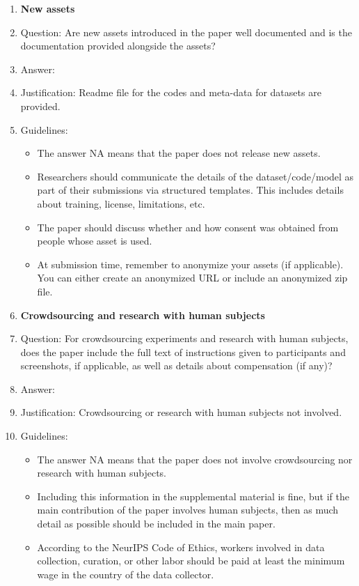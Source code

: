 \documentclass{article}
\begin{document}
\begin{enumerate}
\item {\bf New assets}
    \item[] Question: Are new assets introduced in the paper well documented and is the documentation provided alongside the assets?
    \item[] Answer: \answerYes{} %
    \item[] Justification: Readme file for the codes and meta-data for datasets are provided.
    \item[] Guidelines:
    \begin{itemize}
        \item The answer NA means that the paper does not release new assets.
        \item Researchers should communicate the details of the dataset/code/model as part of their submissions via structured templates. This includes details about training, license, limitations, etc. 
        \item The paper should discuss whether and how consent was obtained from people whose asset is used.
        \item At submission time, remember to anonymize your assets (if applicable). You can either create an anonymized URL or include an anonymized zip file.
    \end{itemize}

\item {\bf Crowdsourcing and research with human subjects}
    \item[] Question: For crowdsourcing experiments and research with human subjects, does the paper include the full text of instructions given to participants and screenshots, if applicable, as well as details about compensation (if any)? 
    \item[] Answer: \answerNA{} %
    \item[] Justification: Crowdsourcing or research with human subjects not involved.
    \item[] Guidelines:
    \begin{itemize}
        \item The answer NA means that the paper does not involve crowdsourcing nor research with human subjects.
        \item Including this information in the supplemental material is fine, but if the main contribution of the paper involves human subjects, then as much detail as possible should be included in the main paper. 
        \item According to the NeurIPS Code of Ethics, workers involved in data collection, curation, or other labor should be paid at least the minimum wage in the country of the data collector. 
    \end{itemize}


\end{enumerate}
\end{document}
